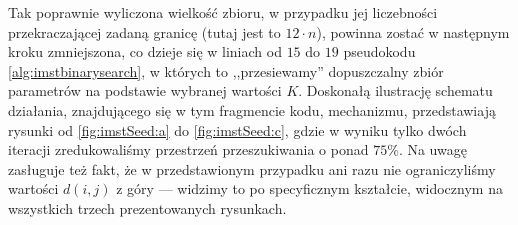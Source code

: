 Tak poprawnie wyliczona wielkość zbioru, w przypadku jej liczebności przekraczającej zadaną granicę (tutaj jest to $12 \cdot n$), powinna zostać w następnym kroku zmniejszona, co dzieje się w liniach od $15$ do $19$ pseudokodu \ref{alg:imstbinarysearch}, w których to ,,przesiewamy'' dopuszczalny zbiór parametrów na podstawie wybranej wartości $K$. Doskonałą ilustrację schematu działania, znajdującego się w tym fragmencie kodu, mechanizmu, przedstawiają rysunki od \ref{fig:imstSeed:a} do \ref{fig:imstSeed:c}, gdzie w wyniku tylko dwóch iteracji zredukowaliśmy przestrzeń przeszukiwania o ponad $75\%$. Na uwagę zasługuje też fakt, że w przedstawionym przypadku ani razu nie ograniczyliśmy wartości $d \left( i, j \right)$ z góry --- widzimy to po specyficznym kształcie, widocznym na wszystkich trzech prezentowanych rysunkach.


